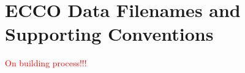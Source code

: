 \pagebreak
\section{ECCO Data Filenames and Supporting Conventions}


\begin{center}
    \textcolor{red}{\Large{On building process!!!}}
\end{center}






